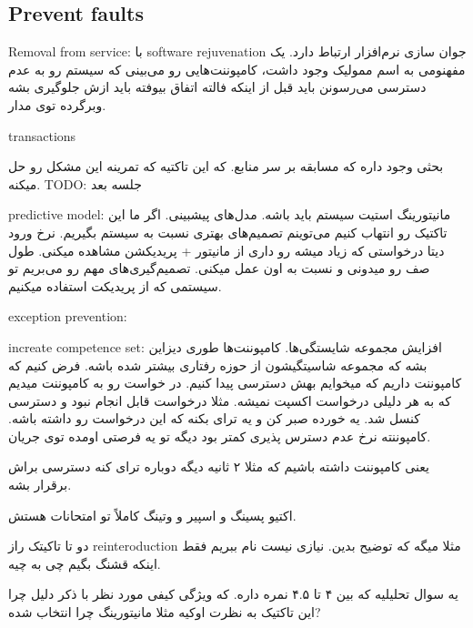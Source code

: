 \subsection{Prevent faults}

Removal from service: با software rejuvenation جوان سازی نرم‌افزار ارتباط دارد.
یک مفهنومی به اسم ممولیک وجود داشت، کامپوننت‌هایی رو می‌بینی که سیستم رو به عدم
دسترسی می‌رسونن باید قبل از اینکه فالته اتفاق بیوفته باید ازش جلوگیری بشه
وبرگرده توی مدار.

transactions

بحثی وجود داره که مسابقه بر سر منابع. که این تاکتیه که تمرینه این مشکل رو حل
میکنه.
TODO: جلسه بعد

predictive model: مانیتورینگ استیت سیستم باید باشه. مدل‌های پیشبینی. اگر ما این
تاکتیک رو انتهاب کنیم می‌توینم تصمیم‌های بهتری نسبت به سیستم بگیریم. نرخ ورود
دیتا درخواستی که زیاد میشه رو داری از مانیتور + پریدیکشن مشاهده میکنی. طول صف رو
میدونی و نسبت به اون عمل میکنی. تصمیم‌گیری‌های مهم رو می‌بریم تو سیستمی که از
پریدیکت استفاده میکنیم.

exception prevention:

increate competence set: افزایش مجموعه شایستگی‌ها. کامپوننت‌ها طوری دیزاین بشه
که مجموعه شاسیتگیشون از حوزه رفتاری بیشتر شده باشه. فرض کنیم که کامپوننت داریم
که میخوایم بهش دسترسی پیدا کنیم. در خواست رو به کامپوننت میدیم که به هر دلیلی
درخواست اکسپت نمیشه. مثلا درخواست قابل انجام نبود و دسترسی کنسل شد. یه خورده صبر
کن و یه ترای بکنه که این درخواست رو داشته باشه. کامپوننته نرخ عدم دسترس پذیری
کمتر بود دیگه تو یه فرصتی اومده توی جریان.

یعنی کامپوننت داشته باشیم که مثلا ۲ ثانیه دیگه دوباره ترای کنه دسترسی براش
برقرار بشه.

اکتیو پسینگ و اسپیر و وتینگ کاملاً تو امتحانات هستش.

دو تا تاکیتک راز reinteroduction مثلا میگه که توضیح بدین. نیازی نیست نام ببریم
فقط اینکه قشنگ بگیم چی به چیه.

یه سوال تحلیلیه که بین ۴ تا ۴.۵ نمره داره. که ویژگی کیفی مورد نظر با ذکر دلیل
چرا این تاکتیک به نظرت اوکیه مثلا مانیتورینگ چرا انتخاب شده?